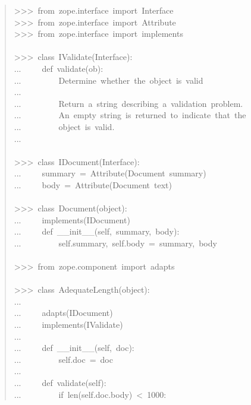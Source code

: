 \documentclass[a4paper,openany,twoside,final]{book}
\begin{document}
\begin{quote}{\ttfamily \raggedright \noindent
>{}>{}>~from~zope.interface~import~Interface\\
>{}>{}>~from~zope.interface~import~Attribute\\
>{}>{}>~from~zope.interface~import~implements\\
~\\
>{}>{}>~class~IValidate(Interface):\\
...~~~~~def~validate(ob):\\
...~~~~~~~~~\textquotedbl{}\textquotedbl{}\textquotedbl{}Determine~whether~the~object~is~valid\\
...\\
...~~~~~~~~~Return~a~string~describing~a~validation~problem.\\
...~~~~~~~~~An~empty~string~is~returned~to~indicate~that~the\\
...~~~~~~~~~object~is~valid.\\
...~~~~~~~~~\textquotedbl{}\textquotedbl{}\textquotedbl{}\\
~\\
>{}>{}>~class~IDocument(Interface):\\
...~~~~~summary~=~Attribute(\textquotedbl{}Document~summary\textquotedbl{})\\
...~~~~~body~=~Attribute(\textquotedbl{}Document~text\textquotedbl{})\\
~\\
>{}>{}>~class~Document(object):\\
...~~~~~implements(IDocument)\\
...~~~~~def~\_\_init\_\_(self,~summary,~body):\\
...~~~~~~~~~self.summary,~self.body~=~summary,~body\\
~\\
>{}>{}>~from~zope.component~import~adapts\\
~\\
>{}>{}>~class~AdequateLength(object):\\
...\\
...~~~~~adapts(IDocument)\\
...~~~~~implements(IValidate)\\
...\\
...~~~~~def~\_\_init\_\_(self,~doc):\\
...~~~~~~~~~self.doc~=~doc\\
...\\
...~~~~~def~validate(self):\\
...~~~~~~~~~if~len(self.doc.body)~<~1000:\\
}
\end{quote}
\end{document}
